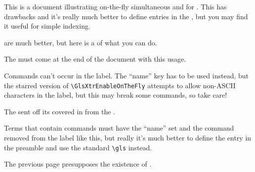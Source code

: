 \documentclass{article}
\begin{document}
This is a  document illustrating on-the-fly
simultaneous  and 
for  
. This has 
drawbacks and it's really much better to define entries in the 
, but you may find it useful for simple 
indexing.

\newpage

  are much better,
but here is a  of what you can do.

\newpage
The  must come at the end of the document 
with this usage.

\newpage
Commands can't occur in the label. The ``name'' key has to be
used instead, but the starred version of
\verb|\GlsXtrEnableOnTheFly| attempts to allow non-ASCII 
characters in the label, but this may break some commands,
so take care! 

The  
 sent 
off its  covered in 
 from the .

Terms that contain commands must have the ``name'' set and the 
command removed from the label 
 like this, but
really it's much better to define the entry in the preamble
and use the standard \verb|\gls| instead.

\newpage
The previous page presupposes the existence of 
.

\newpage

\printglossaries
\end{document}
